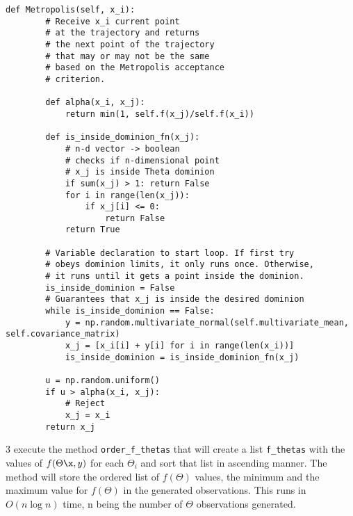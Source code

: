 \documentclass[12pt]{article}
\begin{document}
\begin{lstlisting}
def Metropolis(self, x_i):
		# Receive x_i current point
		# at the trajectory and returns
		# the next point of the trajectory
		# that may or may not be the same
		# based on the Metropolis acceptance
		# criterion.

		def alpha(x_i, x_j):
			return min(1, self.f(x_j)/self.f(x_i))

		def is_inside_dominion_fn(x_j):
			# n-d vector -> boolean
			# checks if n-dimensional point
			# x_j is inside Theta dominion
			if sum(x_j) > 1: return False
			for i in range(len(x_j)):
				if x_j[i] <= 0:
					return False
			return True

		# Variable declaration to start loop. If first try 
		# obeys dominion limits, it only runs once. Otherwise,
		# it runs until it gets a point inside the dominion.
		is_inside_dominion = False
		# Guarantees that x_j is inside the desired dominion
		while is_inside_dominion == False:
			y = np.random.multivariate_normal(self.multivariate_mean, self.covariance_matrix)
			x_j = [x_i[i] + y[i] for i in range(len(x_i))]
			is_inside_dominion = is_inside_dominion_fn(x_j)

		u = np.random.uniform()
		if u > alpha(x_i, x_j):
			# Reject
			x_j = x_i
		return x_j
\end{lstlisting}


3 execute the method \texttt{order\_f\_thetas} that will create a list \texttt{f\_thetas} with the values of $f(\Theta\x, y)$ for each $\Theta_i$ and sort that list in ascending manner. The method will store the ordered list of $f(\Theta)$ values, the minimum and the maximum value for $f(\Theta)$ in the generated observations. This runs in $O(n \log n)$ time, n being the number of $\Theta$ observations generated.
\end{document}
